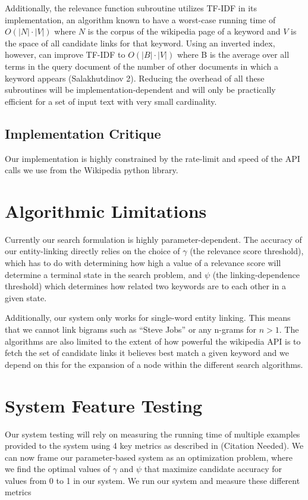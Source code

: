 \documentclass[twoside,11pt]{article}
\begin{document}
Additionally, the relevance function subroutine utilizes TF-IDF in its implementation, an algorithm known to have a worst-case running time of $O(|N|\cdot|V|)$ where $N$ is the corpus of the wikipedia page of a keyword and $V$ is the space of all candidate links for that keyword. Using an inverted index, however, can improve TF-IDF to $O(|B|\cdot|V|)$ where B is the average over all terms in the query document of the number of other documents
in which a keyword appears (Salakhutdinov 2). Reducing the overhead of all these subroutines will be implementation-dependent and will only be practically efficient for a set of input text with very small cardinality.

\subsection{Implementation Critique}
Our implementation is highly constrained by the rate-limit and speed of the API calls we use from the Wikipedia python library.
\section{Algorithmic Limitations}
Currently our search formulation is highly parameter-dependent. The accuracy of our entity-linking directly relies on the choice of $\gamma$ (the relevance score threshold), which has to do with determining how high a value of a relevance score will determine a terminal state in the search problem, and $\psi$ (the linking-dependence threshold) which determines how related two keywords are to each other in a given state.

Additionally, our system only works for single-word entity linking. This means that we cannot link bigrams such as ``Steve Jobs'' or any n-grams for $n > 1$. The algorithms are also limited to the extent of how powerful the wikipedia API is to fetch the set of candidate links it believes best match a given keyword and we depend on this for the expansion of a node within the different search algorithms.

\section{System Feature Testing}

Our system testing will rely on measuring the running time of multiple examples provided to the system using 4 key metrics as described in (Citation Needed). We can now frame our parameter-based system as an optimization problem, where we find the optimal values of $\gamma$ and $\psi$ that maximize candidate accuracy for values from 0 to 1 in our system. We run our system and measure these different metrics
\end{document}
